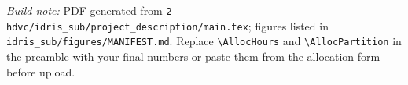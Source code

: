 \documentclass[11pt,a4paper]{article}
\begin{document}
\vfill
\noindent\textit{Build note:} PDF generated from \texttt{2-hdvc/idris\_sub/project\_description/main.tex}; figures listed in \texttt{idris\_sub/figures/MANIFEST.md}. Replace \texttt{\textbackslash AllocHours} and \texttt{\textbackslash AllocPartition} in the preamble with your final numbers or paste them from the allocation form before upload.
\end{document}
